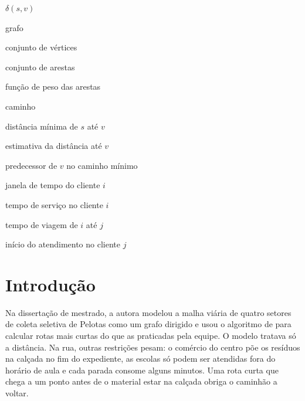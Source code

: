 \documentclass[eq,capa]{texufpel}
\begin{document}
\begin{listofsymbols}{$\delta(s, v)$}
  \item[$G$]            grafo
  \item[$V$]            conjunto de vértices
  \item[$E$]            conjunto de arestas
  \item[$w$]            função de peso das arestas
  \item[$p$]            caminho
  \item[$\delta(s, v)$] distância mínima de $s$ até $v$
  \item[{$d[v]$}]       estimativa da distância até $v$
  \item[{$\pi[v]$}]     predecessor de $v$ no caminho mínimo
  \item[{$[a_i, b_i]$}] janela de tempo do cliente $i$
  \item[$s_i$]          tempo de serviço no cliente $i$
  \item[$\tau_{ij}$]    tempo de viagem de $i$ até $j$
  \item[$t_j$]          início do atendimento no cliente $j$
\end{listofsymbols}

\tableofcontents

\chapter{Introdução}
\label{cap:introducao}

Na dissertação de mestrado, a autora modelou a malha viária de quatro setores
de coleta seletiva de Pelotas como um grafo dirigido e usou o algoritmo de
\citet{Dijkstra:1959:NTP} para calcular rotas mais curtas do que as praticadas
pela equipe. O modelo tratava só a distância. Na rua, outras restrições pesam:
o comércio do centro põe os resíduos na calçada no fim do expediente, as
escolas só podem ser atendidas fora do horário de aula e cada parada consome
alguns minutos. Uma rota curta que chega a um ponto antes de o material estar
na calçada obriga o caminhão a voltar.
\end{document}
